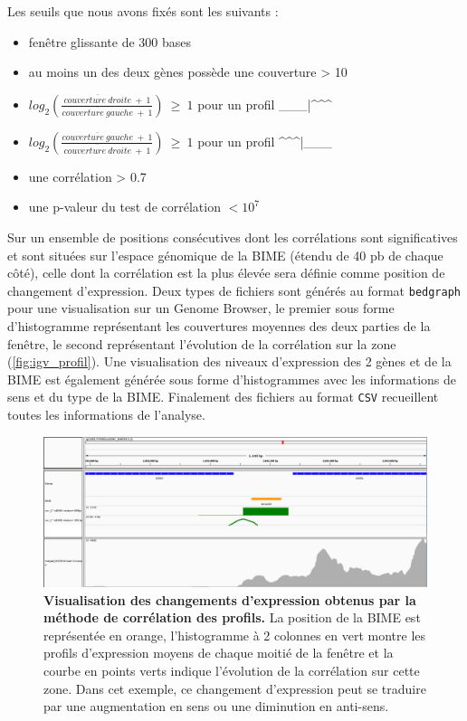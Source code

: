 \documentclass[12pt,a4paper]{report}
\begin{document}
\begin{onehalfspace}
Les seuils que nous avons fixés sont les suivants : 
\begin{itemize}[label=$\bullet$]
\item fenêtre glissante de 300 bases
\item au moins un des deux gènes possède une couverture > 10
\item $log_2(\frac{\overline{couverture~droite}~+~1}{\overline{couverture~gauche}~+~1})~\geq~1$ pour un profil \_\_\_|\^{ }\^{ }\^{ }
\item $log_2(\frac{\overline{couverture~gauche}~+~1}{\overline{couverture~droite}~+~1})~\geq~1$ pour un profil \^{ }\^{ }\^{ }|\_\_\_
\item une corrélation > 0.7
\item une p-valeur du test de corrélation $< 10^7$
\end{itemize}

Sur un ensemble de positions consécutives dont les corrélations sont significatives et sont situées sur l'espace génomique de la BIME (étendu de 40 pb de chaque côté), celle dont la corrélation est la plus élevée sera définie comme position de changement d'expression. Deux types de fichiers sont générés au format \texttt{bedgraph} pour une visualisation sur un Genome Browser, le premier sous forme d'histogramme représentant les couvertures moyennes des deux parties de la fenêtre, le second représentant l'évolution de la corrélation sur la zone (\autoref{fig:igv_profil}). Une visualisation des niveaux d'expression des 2 gènes et de la BIME est également générée sous forme d'histogrammes avec les informations de sens et du type de la BIME. Finalement des fichiers au format \texttt{CSV} recueillent toutes les informations de l'analyse.

\begin{figure}[ht]
\centerline{\includegraphics[scale=0.246]{figures/igv_profil.png}}
\caption{\textbf{Visualisation des changements d'expression obtenus par la méthode de corrélation des profils.} La position de la BIME est représentée en orange, l'histogramme à 2 colonnes en vert montre les profils d'expression moyens de chaque moitié de la fenêtre et la courbe en points verts indique l'évolution de la corrélation sur cette zone. Dans cet exemple, ce changement d'expression peut se traduire par une augmentation en sens ou une diminution en anti-sens.}
\label{fig:igv_profil} 
\end{figure}


\end{onehalfspace}
\end{document}
